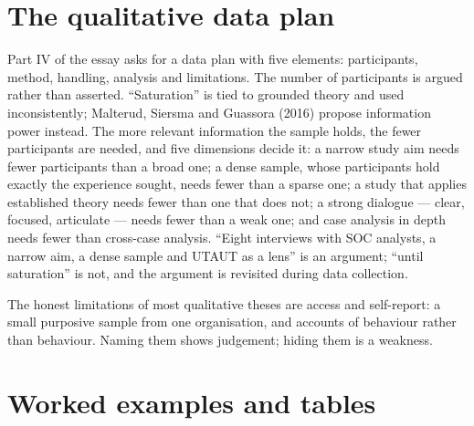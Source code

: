 \documentclass[11pt,a4paper,british,twoside=false,headings=small,chapterprefix=false,numbers=noenddot]{scrbook}
\begin{document}
\section{The qualitative data plan}

Part IV of the essay asks for a data plan with five elements: participants, method, handling, analysis and limitations. The number of participants is argued rather than asserted. ``Saturation'' is tied to grounded theory and used inconsistently; Malterud, Siersma and Guassora (2016) propose information power instead. The more relevant information the sample holds, the fewer participants are needed, and five dimensions decide it: a narrow study aim needs fewer participants than a broad one; a dense sample, whose participants hold exactly the experience sought, needs fewer than a sparse one; a study that applies established theory needs fewer than one that does not; a strong dialogue --- clear, focused, articulate --- needs fewer than a weak one; and case analysis in depth needs fewer than cross-case analysis. ``Eight interviews with SOC analysts, a narrow aim, a dense sample and UTAUT as a lens'' is an argument; ``until saturation'' is not, and the argument is revisited during data collection.

The honest limitations of most qualitative theses are access and self-report: a small purposive sample from one organisation, and accounts of behaviour rather than behaviour. Naming them shows judgement; hiding them is a weakness.


\section{Worked examples and tables}
\end{document}
